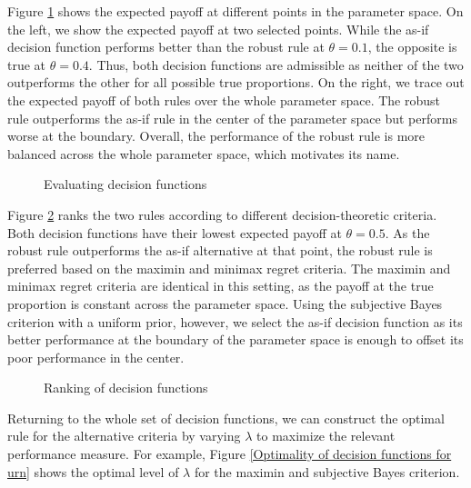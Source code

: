 Figure \ref{Measurement of performance} shows the expected payoff at different points in the parameter space. On the left, we show the expected payoff at two selected points. While the as-if decision function performs better than the robust rule at $\theta = 0.1$, the opposite is true at $\theta = 0.4$. Thus, both decision functions are admissible as neither of the two outperforms the other for all possible true proportions. On the right, we trace out the expected payoff of both rules over the whole parameter space. The robust rule outperforms the as-if rule in the center of the parameter space but performs worse at the boundary. Overall, the performance of the robust rule is more balanced across the whole parameter space, which motivates its name.

\begin{figure}[h!]\centering
{}\hspace{0.3cm}
\caption{Evaluating decision functions}\label{Measurement of performance}
\end{figure}\FloatBarrier

Figure \ref{Ranking of decision functions} ranks the two rules according to different decision-theoretic criteria. Both decision functions have their lowest expected payoff at $\theta = 0.5$. As the robust rule outperforms the as-if alternative at that point, the robust rule is preferred based on the maximin and minimax regret criteria. The maximin and minimax regret criteria are identical in this setting, as the payoff at the true proportion is constant across the parameter space.   Using the subjective Bayes criterion with a uniform prior, however, we select the as-if decision function as its better performance at the boundary of the parameter space is enough to offset its poor performance in the center.

\begin{figure}[h!]\centering
{}
\caption{Ranking of decision functions}\label{Ranking of decision functions}
\end{figure}\FloatBarrier

Returning to the whole set of decision functions, we can construct the optimal rule for the alternative criteria by varying $\lambda$ to maximize the relevant performance measure. For example, Figure \ref{Optimality of decision functions for urn} shows the optimal level of $\lambda$ for the maximin and subjective Bayes criterion.

